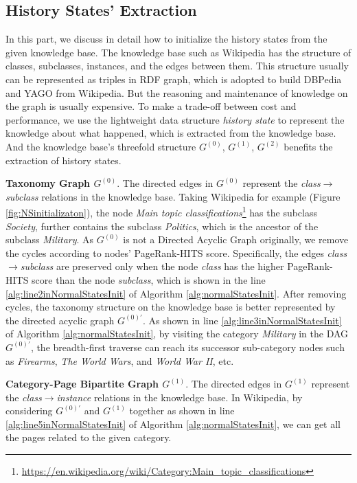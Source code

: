 \documentclass[runningheads,a4paper]{llncs}
\begin{document}
\subsection{History States' Extraction}\label{subsec:hs_initialization}
In this part, we discuss in detail how to initialize the history states from the given knowledge base. 
The knowledge base such as Wikipedia has the structure of classes, subclasses, instances, and the edges between them. 
This structure usually can be represented as triples in RDF graph\cite{klyne2006rdf}, which is adopted to build DBPedia\cite{auer2007dbpedia} and YAGO\cite{suchanek2007yago} from Wikipedia. 
But the reasoning and maintenance of knowledge on the graph is usually expensive\cite{broekstra2003inferencing,bursztyn2015reasoning}. 
To make a trade-off between cost and performance, we use the lightweight data structure \textit{history state} to represent the knowledge about what happened, which is extracted from the knowledge base.
And the knowledge base's threefold structure \(G^{(0)}\), \(G^{(1)}\), \(G^{(2)}\) benefits the extraction of history states. 

\textbf{Taxonomy Graph \(G^{(0)}\)}. The directed edges in \(G^{(0)}\) represent the \textit{class}\(\rightarrow\)\textit{subclass} relations in the knowledge base. 
Taking Wikipedia for example (Figure \ref{fig:NSinitializaton}), the node \textit{Main topic classifications}\footnote{\url{https://en.wikipedia.org/wiki/Category:Main_topic_classifications}} has the subclass \textit{Society}, further contains the subclass \textit{Politics}, which is the ancestor of the subclass \textit{Military}.
As \(G^{(0)}\) is not a Directed Acyclic Graph originally\cite{faralli2015large}, we remove the cycles according to nodes' PageRank-HITS\cite{Yan:2015wq} score.
Specifically, the edges \textit{class}\(\rightarrow\)\textit{subclass} are preserved only when the node \textit{class} has the higher PageRank-HITS score than the node \textit{subclass}, which is shown in the line \ref{alg:line2inNormalStatesInit} of Algorithm \ref{alg:normalStatesInit}.
After removing cycles, the taxonomy structure on the knowledge base is better represented by the directed acyclic graph \(G^{(0)'}\).
As shown in line \ref{alg:line3inNormalStatesInit} of Algorithm \ref{alg:normalStatesInit}, by visiting the category \textit{Military} in the DAG \(G^{(0)'}\), the breadth-first traverse can reach its successor sub-category nodes such as \textit{Firearms}, \textit{The World Wars}, and \textit{World War II}, etc. 

\textbf{Category-Page Bipartite Graph \(G^{(1)}\)}. 
The directed edges in \(G^{(1)}\) represent the \textit{class}\(\rightarrow\)\textit{instance} relations in the knowledge base.
In Wikipedia, by considering \(G^{(0)'}\) and \(G^{(1)}\) together as shown in line \ref{alg:line5inNormalStatesInit} of Algorithm \ref{alg:normalStatesInit}, we can get all the pages related to the given category. 
\end{document}

